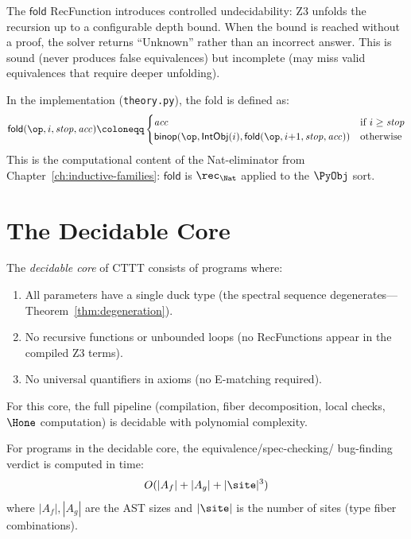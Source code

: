 \begin{remark}
The $\mathsf{fold}$ RecFunction introduces controlled undecidability:
Z3 unfolds the recursion up to a configurable depth bound.  When the
bound is reached without a proof, the solver returns ``Unknown''
rather than an incorrect answer.  This is sound (never produces
false equivalences) but incomplete (may miss valid equivalences that
require deeper unfolding).

In the implementation (\texttt{theory.py}), the fold is defined as:
\[
  \mathsf{fold}(\op, i, \mathit{stop}, \mathit{acc}) \coloneqq
  \begin{cases}
    \mathit{acc} & \text{if } i \geq \mathit{stop} \\
    \mathsf{binop}(\op, \mathsf{IntObj}(i),
      \mathsf{fold}(\op, i{+}1, \mathit{stop}, \mathit{acc}))
      & \text{otherwise}
  \end{cases}
\]
This is the computational content of the Nat-eliminator from
Chapter~\ref{ch:inductive-families}: $\mathsf{fold}$ is
$\rec_\Nat$ applied to the $\PyObj$ sort.
\end{remark}

\section{The Decidable Core}

The \emph{decidable core} of CTTT consists of programs where:
\begin{enumerate}
  \item All parameters have a single duck type (the spectral sequence
    degenerates---Theorem~\ref{thm:degeneration}).
  \item No recursive functions or unbounded loops (no RecFunctions
    appear in the compiled Z3 terms).
  \item No universal quantifiers in axioms (no E-matching required).
\end{enumerate}

For this core, the full pipeline (compilation, fiber decomposition,
local checks, $\Hone$ computation) is decidable with polynomial
complexity.

\begin{theorem}
\label{thm:decidable-core}
For programs in the decidable core, the equivalence/spec-checking/
bug-finding verdict is computed in time:
\[
  O(|A_f| + |A_g| + |\site|^3)
\]
where $|A_f|, |A_g|$ are the AST sizes and $|\site|$ is the number
of sites (type fiber combinations).
\end{theorem}

